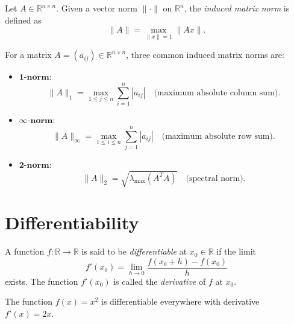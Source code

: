 \begin{definition}
Let $A \in \mathbb{R}^{n \times n}$.  
Given a vector norm $\|\cdot\|$ on $\mathbb{R}^n$, the \emph{induced matrix norm} is defined as
\begin{equation}
\|A\| = \max_{\|x\|=1} \|Ax\|.
\end{equation}
\end{definition}

\begin{example}
For a matrix $A = (a_{ij}) \in \mathbb{R}^{n \times n}$, three common induced matrix norms are:
\begin{itemize}
    \item $\mathbf{1\text{-norm}}$:  
    \begin{equation}
    \|A\|_1 = \max_{1 \leq j \leq n} \sum_{i=1}^n |a_{ij}| 
    \quad \text{(maximum absolute column sum)}.
    \end{equation}
    \item $\mathbf{\infty\text{-norm}}$:  
    \begin{equation}
    \|A\|_\infty = \max_{1 \leq i \leq n} \sum_{j=1}^n |a_{ij}| 
    \quad \text{(maximum absolute row sum)}.
    \end{equation}
    \item $\mathbf{2\text{-norm}}$:  
    \begin{equation}
    \|A\|_2 = \sqrt{\lambda_{\max}(A^TA)}
    \quad \text{(spectral norm)}.
    \end{equation}
\end{itemize}
\end{example}

\section{Differentiability}

\begin{definition}
A function $f:\mathbb{R}\to \mathbb{R}$ is said to be \emph{differentiable} at $x_0\in \mathbb{R}$ if the limit
\begin{equation}
f'(x_0) = \lim_{h\to 0} \frac{f(x_0+h)-f(x_0)}{h}
\end{equation}
exists. The function $f'(x_0)$ is called the \emph{derivative} of $f$ at $x_0$.
\end{definition}

\begin{example}
The function $f(x)=x^2$ is differentiable everywhere with derivative $f'(x)=2x$.
\end{example}

